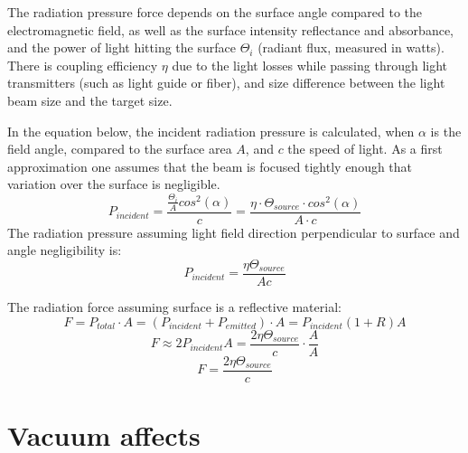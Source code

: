 \documentclass[\main/master.tex]{subfiles}
\begin{document}
\par\noindent
The radiation pressure force depends on the surface angle compared to the electromagnetic field, as well as the surface intensity reflectance and absorbance, and the power of light hitting the surface $\Theta_i$ (radiant flux, measured in watts). There is coupling efficiency $\eta$ due to the light losses while passing through light transmitters (such as light guide or fiber), and size difference between the light beam size and the target size. 
\par\noindent
In the equation below, the incident radiation pressure is calculated, when $\alpha$ is the field angle, compared to the surface area $A$, and $c$ the speed of light. As a first approximation one assumes that the beam is focused tightly enough that variation over the surface is negligible. 
\begin{equation}
P_{incident} = \frac{\frac{\Theta_i}{A}cos^2(\alpha)}{c} = \frac{\eta\cdot \Theta_{source}\cdot cos^2(\alpha)}{{A\cdot c}} \label{eqn:radiation_pressure}
\end{equation}
The radiation pressure assuming light field direction perpendicular to surface and angle negligibility is: 
\begin{equation}
P_{incident} = \frac{\eta\Theta_{source}}{{Ac}} \label{eqn:radiation_pressure_perpendicular}
\end{equation}
\par\noindent
The radiation force assuming surface is a reflective material:
\begin{equation}
F = P_{total}\cdot A = (P_{incident}+P_{emitted})\cdot A = P_{incident}(1+R)A \label{eqn:radiation_force}
\end{equation}
\begin{equation}
F \approx 2P_{incident}A = \frac{2\eta\Theta_{source}}{{c}}\cdot \frac{A}{A} \label{eqn:radiation_force_reflective}
\end{equation}
\begin{equation}
F = \frac{2\eta\Theta_{source}}{{c}} \label{eqn:radiation_force_power}
\end{equation}

\section{Vacuum affects}
\end{document}
